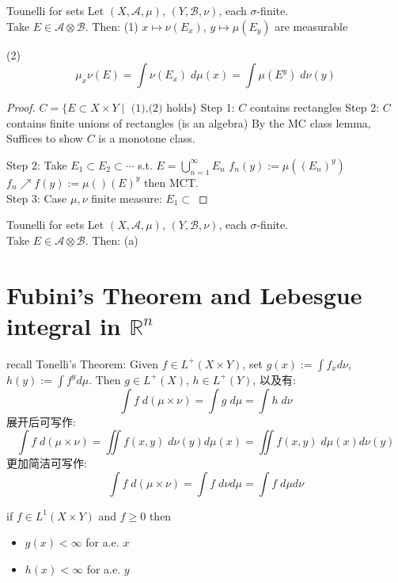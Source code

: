\documentclass[lang=cn,11pt]{elegantbook}
\begin{document}
\begin{theorem}{Tounelli for sets}
Let $(X,\mathcal{A}, \mu)$, $(Y, \mathcal{B}, \nu)$, each $\sigma$-finite.\\
Take $E \in \mathcal{A} \otimes \mathcal{B}$. Then: 
(1) $x \mapsto \nu(E_x)$, $y \mapsto \mu(E_y)$ are measurable

(2) \[
\mu_x \nu(E) = \int \nu(E_x)  \; d\mu(x) = \int \mu(E^y) \; d \nu(y)
\]
    
\end{theorem}
\begin{proof}
    $C = \{ E \subset X \times Y \mid \text{ (1),(2) holds}\}$
    Step 1: $C$ contains rectangles
    Step 2: $C$ contains finite unions of rectangles  (is an algebra)
  By the MC class lemma, Suffices to show $C$ is a monotone class.

  Step 2: Take $E_1 \subset E_2 \subset \cdots $ s.t. $E = \bigcup_{n=1}^\infty E_n$
$f_n(y) := \mu((E_n)^y)$
$f_n \nearrow f(y) := \mu()(E)^y$
then MCT.\\
Step 3: Case $\mu,\nu$ finite measure: $E_1 \subset$
\end{proof}




\begin{theorem}{Tounelli for sets}
 Let $(X,\mathcal{A}, \mu)$, $(Y, \mathcal{B}, \nu)$, each $\sigma$-finite.\\
Take $E \in \mathcal{A} \otimes \mathcal{B}$. Then: 
(a) 
\end{theorem}
















\chapter{Fubini's Theorem and Lebesgue integral in $\mathbb{R}^n$}
recall Tonelli's Theorem: Given $f \in L^+(X \times Y)$, set $g(x) := \int f_x d\nu $, $h(y) := \int f^y d \mu$. 
Then $g \in L^+(X)$, $h \in L^+(Y)$, 以及有: \[
\int f \; d(\mu \times \nu) = \int g \; d \mu = \int h \; d\nu
\]
展开后可写作: \[
\int f \; d(\mu \times \nu)  = \iint  f(x,y) \; d\nu(y) d\mu(x) = \iint f(x,y) \; d\mu(x) d\nu(y)
\]更加简洁可写作: \[
\int f \; d(\mu \times \nu) = \int f \; d\nu d\mu  = \int f \; d\mu d\nu
\]

\begin{corollary}
    if $f \in L^1(X\times Y)$ and $f \geq 0$ then 
    \begin{itemize}
        \item     $g(x) < \infty$ for a.e. $x$
        \item $h(x) < \infty$ for a.e. $y$
    \end{itemize}
\end{corollary}
\end{document}
